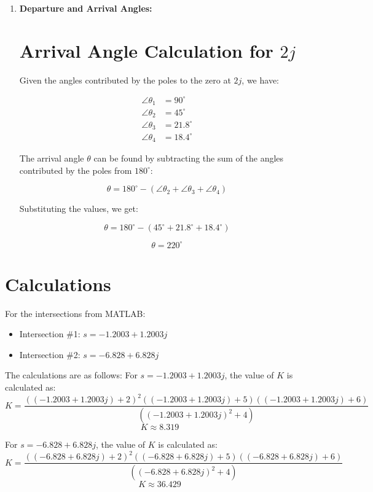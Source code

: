 \documentclass[11pt]{article}
\begin{document}
\begin{enumerate}
    \item \textbf{Departure and Arrival Angles:}
\section*{Arrival Angle Calculation for \( 2j \)}

Given the angles contributed by the poles to the zero at \( 2j \), we have:

\begin{align*}
\angle \theta_1 &= 90^\circ \\
\angle \theta_2 &= 45^\circ \\
\angle \theta_3 &= 21.8^\circ \\
\angle \theta_4 &= 18.4^\circ
\end{align*}

The arrival angle \( \theta \) can be found by subtracting the sum of the angles contributed by the poles from \( 180^\circ \):

\[
\theta = 180^\circ - (\angle \theta_2 + \angle \theta_3 + \angle \theta_4)
\]

Substituting the values, we get:

\[
\theta = 180^\circ - (45^\circ + 21.8^\circ + 18.4^\circ)
\]

\[
\theta = 220^\circ
\]

\end{enumerate}

\section*{Calculations}
For the intersections from MATLAB:

\begin{itemize}
    \item Intersection \#1: \( s = -1.2003 + 1.2003j \)
    \item Intersection \#2: \( s = -6.828 + 6.828j \)
\end{itemize}
\noindent
The calculations are as follows:
For \( s = -1.2003 + 1.2003j \), the value of \( K \) is calculated as:
\[ K = \frac{((-1.2003 + 1.2003j)+2)^2((-1.2003 + 1.2003j)+5)((-1.2003 + 1.2003j)+6)}{((-1.2003 + 1.2003j)^2+4)} \]
\[ K \approx 8.319 \]

For \( s = -6.828 + 6.828j \), the value of \( K \) is calculated as:
\[ K = \frac{((-6.828 + 6.828j)+2)^2((-6.828 + 6.828j)+5)((-6.828 + 6.828j)+6)}{((-6.828 + 6.828j)^2+4)} \]
\[ K \approx 36.429 \]
\end{document}
